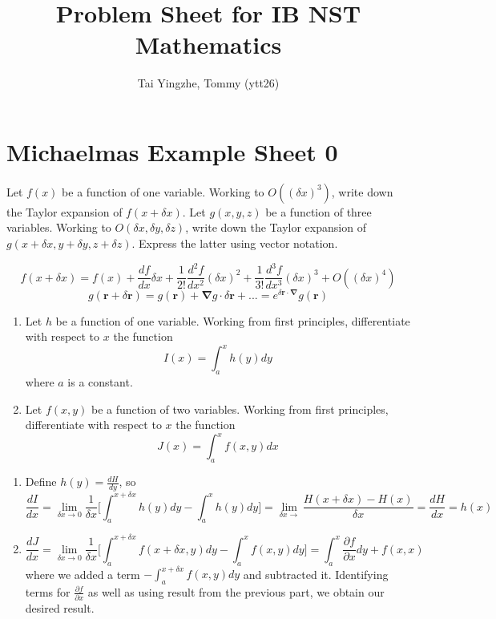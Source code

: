 \documentclass[a4paper]{article}
\title{\textbf{Problem Sheet for IB NST Mathematics}}
\author{Tai Yingzhe, Tommy (ytt26)}
\date{}
\begin{document}
\maketitle
\tableofcontents
\newpage
\section{Michaelmas Example Sheet 0}
\begin{qns}
Let $f(x)$ be a function of one variable. Working to $O((\delta x)^3)$, write down the Taylor expansion of $f(x+\delta x)$. Let $g(x,y,z)$ be a function of three variables. Working to $O(\delta x,\delta y,\delta z)$, write down the Taylor expansion of $g(x+\delta x,y+\delta y,z+\delta z)$. Express the latter using vector notation.
\end{qns}
\begin{ans}
$$f(x+\delta x)=f(x)+\frac{df}{dx}\delta x+\frac{1}{2!}\frac{d^2f}{dx^2}(\delta x)^2+\frac{1}{3!}\frac{d^3f}{dx^3}(\delta x)^3+O((\delta x)^4)$$
$$g(\mathbf{r}+\delta\mathbf{r})=g(\mathbf{r})+\boldsymbol{\nabla}g\cdot\delta\mathbf{r}+...=e^{\delta\mathbf{r}\cdot\boldsymbol{\nabla}}g(\mathbf{r})$$
\end{ans}
\begin{qns}\leavevmode
\begin{enumerate}[label=(\alph*)]
\item Let $h$ be a function of one variable. Working from first principles, differentiate with respect to $x$ the function
$$I(x)=\int_a^xh(y)dy$$
where $a$ is a constant.
\item Let $f(x,y)$ be a function of two variables. Working from first principles, differentiate with respect to $x$ the function
$$J(x)=\int_a^xf(x,y)dx$$
\end{enumerate}
\end{qns}
\begin{ans}\leavevmode
\begin{enumerate}[label=(\alph*)]
\item Define $h(y)=\frac{dH}{dy}$, so
$$\frac{dI}{dx}=\lim_{\delta x\rightarrow0}\frac{1}{\delta x}\bigg[\int_a^{x+\delta x}h(y)dy-\int_a^xh(y)dy\bigg]=\lim_{\delta x\rightarrow}\frac{H(x+\delta x)-H(x)}{\delta x}=\frac{dH}{dx}=h(x)$$
\item 
$$\frac{dJ}{dx}=\lim_{\delta x\rightarrow0}\frac{1}{\delta x}\bigg[\int_a^{x+\delta x}f(x+\delta x,y)dy-\int_a^xf(x,y)dy\bigg]=\int_a^x\frac{\partial f}{\partial x}dy+f(x,x)$$
where we added a term $-\int_a^{x+\delta x}f(x,y)dy$ and subtracted it. Identifying terms for $\frac{\partial f}{\partial x}$ as well as using result from the previous part, we obtain our desired result.
\end{enumerate}
\end{ans}
\end{document}
